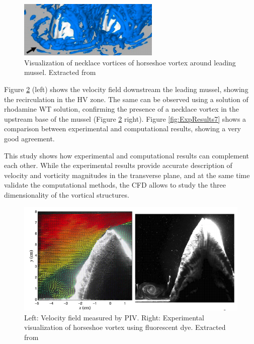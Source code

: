 \documentclass[journal]{new-aiaa}
\begin{document}
\begin{figure}[H]
\begin{center}
\includegraphics[width=0.6\textwidth]{Images/federico/Figure15}
\caption{Visualization of necklace vortices of horseshoe vortex around leading mussel. Extracted from \cite{Constantinescu2013}}
\label{fig:ExpResults5}
\end{center}
\end{figure}

Figure \ref{fig:ExpResults6} (left) shows the velocity field downstream the leading mussel, showing the recirculation in the  HV zone. The same can be observed using a solution of rhodamine WT solution, confirming the presence of a necklace vortex in the upstream base of the mussel (Figure \ref{fig:ExpResults6} right). Figure \ref{fig:ExpResults7} shows a comparison between experimental and computational results, showing a very good agreement.

This study shows how experimental and computational results can complement each other. While the experimental results provide accurate description of velocity and vorticity magnitudes in the transverse plane, and at the same time validate the computational methods, the CFD allows to study the three dimensionality of the vortical structures.  




\begin{figure}[H]
\begin{center}
\includegraphics[width=1\textwidth]{Images/federico/Figure16}
\caption{Left: Velocity field measured by PIV. Right: Experimental visualization of horseshoe vortex using fluorescent dye. Extracted from \cite{Constantinescu2013}}
\label{fig:ExpResults6}
\end{center}
\end{figure}
\end{document}
